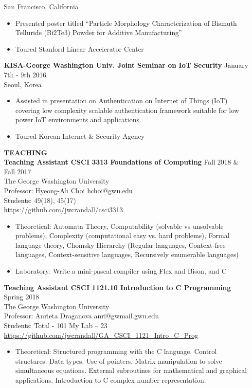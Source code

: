 \begin{singlespace}
San Francisco, California
\begin{itemize}
	\item Presented poster titled “Particle Morphology Characterization of Bismuth Telluride (Bi2Te3) Powder for Additive Manufacturing”
	\item Toured Stanford Linear Accelerator Center
\end{itemize}
\textbf{KISA-George Washington Univ. Joint Seminar on IoT Security} \hfill January 7th - 9th  2016\\
Seoul, Korea
\begin{itemize}
	\item Assisted in presentation on Authentication on Internet of Things (IoT) covering low complexity scalable authentication framework suitable for low power IoT environments and applications. 
	\item Toured Korean Internet \& Security Agency
\end{itemize}

\textbf{TEACHING}\\
\textbf{Teaching Assistant CSCI 3313 Foundations of Computing} \hfill Fall 2018 \& Fall 2017\\
The George Washington University\\
Professor: Hyeong-Ah Choi hchoi@gwu.edu\\
Students: 49(18), 45(17)\\
\url{https://github.com/jwcrandall/csci3313}
\begin{itemize}
	\item Theoretical: Automata Theory, Computability (solvable vs unsolvable problems), Complexity (computational easy vs. hard problems), Formal language theory, Chomsky Hierarchy (Regular languages, Context-free languages, Context-sensitive languages, Recursively enumerable languages)
	\item Laboratory: Write a mini-pascal compiler using Flex and Bison, and C
\end{itemize}
\textbf{Teaching Assistant CSCI 1121.10 Introduction to C Programming} \hfill Spring 2018\\
The George Washington University\\
Professor: Anrieta Draganova anri@gwmail.gwu.edu\\
Students: Total - 101 My Lab – 23\\
\url{https://github.com/jwcrandall/GA_CSCI_1121_Intro_C_Prog}
\begin{itemize}
	\item Theoretical: Structured programming with the C language. Control structures. Data types. Use of pointers. Matrix manipulation to solve simultaneous equations. External subroutines for mathematical and graphical applications. Introduction to C complex number representation.
\end{itemize}


\end{singlespace}
